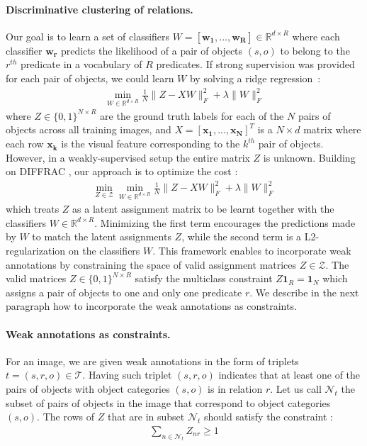 \documentclass[10pt,twocolumn,letterpaper]{article}
\newcommand{\spaceparagraph}{\vspace{-.35cm}}
\begin{document}
\spaceparagraph
\paragraph{Discriminative clustering of relations.}
Our goal is to learn a set of classifiers $W = [\mathbf{w_1},...,\mathbf{w_R}] \in \mathbb{R}^{d \times R}$ where each classifier $\mathbf{w_r}$ predicts the likelihood of a pair of objects $(s,o)$ to belong to the $r^{th}$ predicate in a vocabulary of $R$ predicates. If strong supervision was provided for each pair of objects, we could learn $W$ by solving a ridge regression~:
\vspace{-0.5cm}
\begin{align}
\label{eq:ridgereg}
\min_{W \in \mathbb{R}^{d \times R}} \frac{1}{N} \|Z - XW \|^2_F + \lambda \|W\|^2_F
\end{align}
where $Z \in \{0,1\}^{N \times R}$ are the ground truth labels for each of the $N$ pairs of objects across all training images, and $X = [\mathbf{x_1}, ..., \mathbf{x_N}]^T$ is a $N \times d$ matrix where each row $\mathbf{x_k}$ is the visual feature corresponding to the $k^{th}$ pair of objects. However, in a weakly-supervised setup the entire matrix $Z$ is unknown. Building on DIFFRAC \cite{bach2008diffrac}, our approach is to optimize the cost : 
\vspace{-0.2cm}
\begin{align}
\label{DIFFRAC}
\min_{Z \in \mathcal{Z}} \min_{W \in \mathbb{R}^{d \times R}} \frac{1}{N} \|Z - XW \|^2_F + \lambda \|W\|^2_F
\end{align}
\noindent which treats $Z$ as a latent assignment matrix to be learnt together with the classifiers $W \in \mathbb{R}^{d \times R}$. Minimizing the first term encourages the predictions made by $W$ to match the latent assignments $Z$, while the second term is a L2-regularization on the classifiers $W$. This framework enables to incorporate weak annotations by constraining the space of valid assignment matrices $Z \in \mathcal{Z}$. The valid matrices $Z \in \{0,1\}^{N \times R}$ satisfy the multiclass constraint $Z \textbf{1}_R = \textbf{1}_N$ which assigns a pair of objects to one and only one predicate $r$. We describe in the next paragraph how to incorporate the weak annotations as constraints. 

\spaceparagraph
\paragraph{Weak annotations as constraints.} For an image, we are given weak annotations in the form of triplets $t = (s,r,o) \in \mathcal{T}$. Having such triplet $(s,r,o)$ indicates that at least one of the pairs of objects with object categories $(s,o)$ is in relation $r$. Let us call $\mathcal{N}_t$ the subset of pairs of objects in the image that correspond to object categories $(s,o)$. The rows of $Z$ that are in subset $\mathcal{N}_t$ should satisfy the constraint : 
\vspace{-0.2cm}
\begin{align}
\label{eq:multi_instance}
\sum_{n \in \mathcal{N}_t} Z_{nr} \ge 1
\end{align}
\vspace{-0.4cm}
\end{document}
